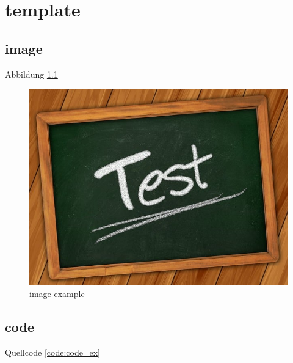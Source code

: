\chapter{template}
\section{image}
Abbildung \ref{fig:img_ex}

\begin{figure}[H]
	\centering
	\includegraphics[width=0.8\linewidth]{figures/test.jpg}
	\caption{image example}
	\label{fig:img_ex}
\end{figure}

\section{code}
Quellcode \ref{code:code_ex} 

